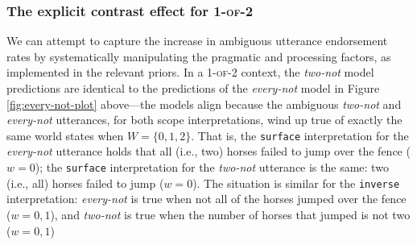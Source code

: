 \documentclass[preprint,authoryear]{elsarticle}\frenchspacing
\newcommand{\lp}[1]{\textcolor{red}{#1}} %
\begin{document}
\subsubsection{The explicit contrast effect for \textsc{1-of-2}}


We can attempt to capture the increase in ambiguous utterance endorsement rates by systematically manipulating the pragmatic and processing factors, as implemented in the relevant priors. In a \textsc{1-of-2} context, the \emph{two-not} model predictions are identical to the predictions of the \emph{every-not} model in Figure \ref{fig:every-not-plot} above---the models align because the ambiguous \emph{two-not} and \emph{every-not} utterances, for both scope interpretations, wind up true of exactly the same world states when $W = \{0, 1, 2\}$. 
That is, the \texttt{surface} interpretation for the \textit{every-not} utterance 
holds that all (i.e., two) horses failed to jump over the fence ($w=0$); 
the \texttt{surface} interpretation for the \textit{two-not} utterance 
is the same: two (i.e., all) horses failed to jump ($w=0$).
The situation is similar for the \texttt{inverse} interpretation: \emph{every-not} is true when not all of the horses jumped over the fence ($w = 0, 1$), and \emph{two-not} is true when the number of horses that jumped is not two ($w = 0,1$)
\end{document}
